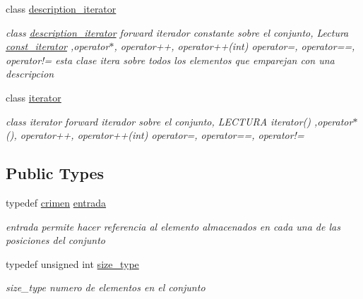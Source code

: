 \begin{DoxyCompactItemize}
class \hyperlink{classconjunto_1_1description__iterator}{description\+\_\+iterator}
\begin{DoxyCompactList}\small\item\em class \hyperlink{classconjunto_1_1description__iterator}{description\+\_\+iterator} forward iterador constante sobre el conjunto, Lectura \hyperlink{classconjunto_1_1const__iterator}{const\+\_\+iterator} ,operator$\ast$, operator++, operator++(int) operator=, operator==, operator!= esta clase itera sobre todos los elementos que emparejan con una descripcion \end{DoxyCompactList}\item 
class \hyperlink{classconjunto_1_1iterator}{iterator}
\begin{DoxyCompactList}\small\item\em class iterator forward iterador sobre el conjunto, L\+E\+C\+T\+U\+R\+A iterator() ,operator$\ast$(), operator++, operator++(int) operator=, operator==, operator!= \end{DoxyCompactList}\end{DoxyCompactItemize}
\subsection*{Public Types}
\begin{DoxyCompactItemize}
\item 
\hypertarget{classconjunto_a7630ace7cb17bcec07daf5804f1a0780}{}typedef \hyperlink{classcrimen}{crimen} \hyperlink{classconjunto_a7630ace7cb17bcec07daf5804f1a0780}{entrada}\label{classconjunto_a7630ace7cb17bcec07daf5804f1a0780}

\begin{DoxyCompactList}\small\item\em entrada permite hacer referencia al elemento almacenados en cada una de las posiciones del conjunto \end{DoxyCompactList}\item 
\hypertarget{classconjunto_a0cc9902da62790ec2a6d59f4559c2df5}{}typedef unsigned int \hyperlink{classconjunto_a0cc9902da62790ec2a6d59f4559c2df5}{size\+\_\+type}\label{classconjunto_a0cc9902da62790ec2a6d59f4559c2df5}

\begin{DoxyCompactList}\small\item\em size\+\_\+type numero de elementos en el conjunto \end{DoxyCompactList}\end{DoxyCompactItemize}
